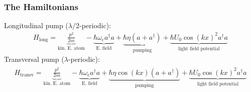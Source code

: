 \documentclass[pdflatex,compress]{beamer}
\begin{document}
\begin{frame}
\frametitle{The Hamiltonians}
Longitudinal pump ($\lambda / 2$-periodic):
\begin{align}
H_\text{long} = \underbrace{\frac{p^2}{2m}}_{\text{kin. E. atom}} - \underbrace{\hbar \omega_\text{c} a^\dagger a}_{\text{E. field}} + \underbrace{\hbar \eta (a + a^\dagger)}_{\text{pumping}} + \underbrace{\hbar U_0 \cos(kx)^2 a^\dagger a}_{\text{light field potential}}
\end{align}Transversal pump ($\lambda$-periodic):
\begin{align}
\begin{split}
H_\text{transv} = \underbrace{\frac{p^2}{2m}}_{\text{kin. E. atom}} - \underbrace{\hbar \omega_\text{c} a^\dagger a}_{\text{E. field}} + \underbrace{\hbar \eta \cos(kx) (a + a^\dagger)}_{\text{pumping}} +\underbrace{\hbar U_0 \cos(kx)^2 a^\dagger a}_{\text{light field potential}}
\end{split}
\end{align}
\end{frame}
\end{document}
